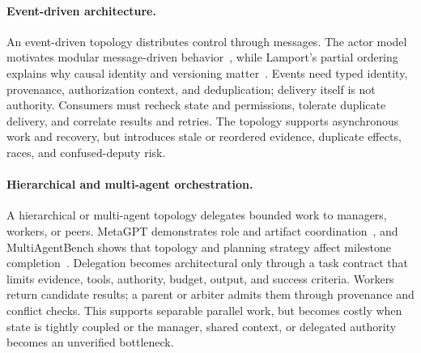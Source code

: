 \paragraph{Event-driven architecture.}
An event-driven topology distributes control through messages. The actor model motivates modular message-driven behavior~\cite{hewitt1973actor}, while Lamport's partial ordering explains why causal identity and versioning matter~\cite{lamport1978timeclocks}. Events need typed identity, provenance, authorization context, and deduplication; delivery itself is not authority. Consumers must recheck state and permissions, tolerate duplicate delivery, and correlate results and retries. The topology supports asynchronous work and recovery, but introduces stale or reordered evidence, duplicate effects, races, and confused-deputy risk.

\paragraph{Hierarchical and multi-agent orchestration.}
A hierarchical or multi-agent topology delegates bounded work to managers, workers, or peers. MetaGPT demonstrates role and artifact coordination~\cite{hong2024metagpt}, and MultiAgentBench shows that topology and planning strategy affect milestone completion~\cite{zhu2025multiagentbench}. Delegation becomes architectural only through a task contract that limits evidence, tools, authority, budget, output, and success criteria. Workers return candidate results; a parent or arbiter admits them through provenance and conflict checks. This supports separable parallel work, but becomes costly when state is tightly coupled or the manager, shared context, or delegated authority becomes an unverified bottleneck.

